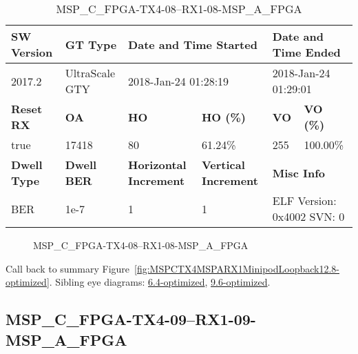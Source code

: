 \begin{table}[h]
\centering
\caption{MSP\_C\_FPGA-TX4-08--RX1-08-MSP\_A\_FPGA}
\label{tab:MSPCFPGATX408RX108MSPAFPGA12.8-optimized}
\begin{tabular}{@{}|l|l|l|l|l|l|@{}}
\toprule
\textbf{SW Version}                & \textbf{GT Type}   & \multicolumn{2}{l|}{\textbf{Date and Time Started}}            & \multicolumn{2}{l|}{\textbf{Date and Time Ended}}        \\ \midrule
2017.2                       & UltraScale GTY          & \multicolumn{2}{l|}{2018-Jan-24 01:28:19}                   & \multicolumn{2}{l|}{2018-Jan-24 01:29:01}               \\ \midrule
\textbf{Reset RX}                  & \textbf{OA} & \textbf{HO}   & \textbf{HO (\%)} & \textbf{VO} & \textbf{VO (\%)} \\ \midrule
true & 17418        & 80          & 61.24\%        & 255        & 100.00\%       \\ \midrule
\textbf{Dwell Type}                & \textbf{Dwell BER} & \textbf{Horizontal Increment} & \textbf{Vertical Increment}    & \multicolumn{2}{l|}{\textbf{Misc Info}}                  \\ \midrule
BER                            & 1e-7        & 1        & 1           & \multicolumn{2}{l|}{ELF Version: 0x4002 SVN: 0}                         \\ \bottomrule
\end{tabular}
\end{table}

\begin{figure}[h]
\caption{MSP\_C\_FPGA-TX4-08--RX1-08-MSP\_A\_FPGA} \label{fig:MSPCFPGATX408RX108MSPAFPGA12.8-optimized}
\end{figure}

Call back to summary Figure~\ref{fig:MSPCTX4MSPARX1MinipodLoopback12.8-optimized}.
Sibling eye diagrams: \hyperref[sec:MSPCFPGATX408RX108MSPAFPGA6.4-optimized]{6.4-optimized}, \hyperref[sec:MSPCFPGATX408RX108MSPAFPGA9.6-optimized]{9.6-optimized}.

\clearpage
\newpage


\subsection{MSP\_C\_FPGA-TX4-09--RX1-09-MSP\_A\_FPGA}\label{sec:MSPCFPGATX409RX109MSPAFPGA12.8-optimized}

